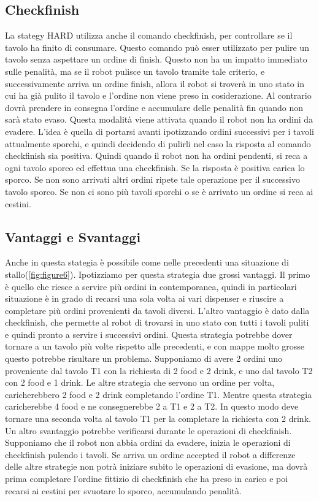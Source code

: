 \subsection{Checkfinish}
La stategy HARD utilizza anche il comando checkfinish, per controllare se il tavolo ha finito di consumare. Questo comando può esser utilizzato per pulire un tavolo senza aspettare un ordine di finish. Questo non ha un impatto immediato sulle penalità, ma se il robot pulisce un tavolo tramite tale criterio, e successivamente arriva un ordine finish, allora il robot si troverà in uno stato in cui ha già pulito il tavolo e l'ordine non viene preso in cosiderazione. Al contrario dovrà prendere in consegna l'ordine e accumulare delle penalità fin quando non sarà stato evaso.
Questa modalità viene attivata quando il robot non ha ordini da evadere. L'idea è quella di portarsi avanti ipotizzando ordini successivi per i tavoli attualmente sporchi, e quindi decidendo di pulirli nel caso la risposta al comando checkfinish sia positiva. Quindi quando il robot non ha ordini pendenti, si reca a ogni tavolo sporco ed effettua una checkfinish. Se la risposta è positiva carica lo sporco. Se non sono arrivati altri ordini ripete tale operazione per il successivo tavolo sporco. Se non ci sono più tavoli sporchi o se è arrivato un ordine si reca ai cestini.


\subsection{Vantaggi e Svantaggi}
Anche in questa stategia è possibile come nelle precedenti una situazione di stallo(\ref{fig:figure6}).
Ipotizziamo per questa strategia due grossi vantaggi. Il primo è quello che riesce a servire più ordini in contemporanea, quindi in particolari situazione è in grado di recarsi una sola volta ai vari dispenser e riuscire a completare più ordini provenienti da tavoli diversi. L'altro vantaggio è dato dalla checkfinish, che permette al robot di trovarsi in uno stato con tutti i tavoli puliti e quindi pronto a servire i successivi ordini.
Questa strategia potrebbe dover tornare a un tavolo più volte rispetto alle precedenti, e con mappe molto grosse questo potrebbe risultare un problema. Supponiamo di avere 2 ordini uno proveniente dal tavolo T1 con la richiesta di 2 food e 2 drink, e uno dal tavolo T2 con 2 food e 1 drink. Le altre strategia che servono un ordine per volta, caricherebbero 2 food e 2 drink completando l'ordine T1. Mentre questa strategia caricherebbe 4 food e ne consegnerebbe 2 a T1 e 2 a T2. In questo modo deve tornare una seconda volta al tavolo T1 per la completare la richiesta con 2 drink.
Un altro svantaggio potrebbe verificarsi durante le operazioni di checkfinish. Supponiamo che il robot non abbia ordini da evadere, inizia le operazioni di checkfinish pulendo i tavoli. Se arriva un ordine accepted il robot a differenze delle altre strategie non potrà iniziare subito le operazioni di evasione, ma dovrà prima completare l'ordine fittizio di checkfinish che ha preso in carico e poi recarsi ai cestini per svuotare lo sporco, accumulando penalità.


